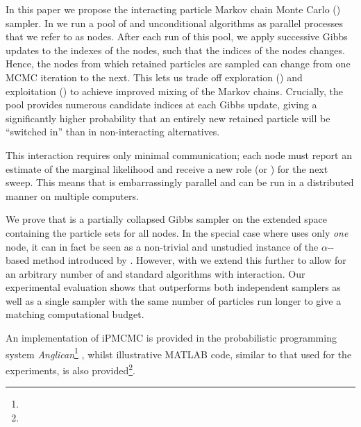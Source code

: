 In this paper we propose the interacting particle Markov chain Monte Carlo (\ipmcmc) sampler. In \ipmcmc we run a pool of \csmc and unconditional \smc algorithms as parallel processes that we refer to as nodes. After each run of this pool, we apply successive Gibbs updates to the indexes of the \csmc nodes, such that the indices of the \csmc nodes changes. Hence, the nodes from which retained particles are sampled can change from one MCMC iteration to the next. This lets us trade off exploration (\smc) and exploitation (\csmc) to achieve improved mixing of the Markov chains. Crucially, the pool provides numerous candidate indices at each Gibbs update, giving a significantly higher probability that an entirely new retained particle will be ``switched in'' than in non-interacting alternatives.

This interaction requires only minimal communication; each node must report an estimate of the marginal likelihood and receive a new role (\smc or \csmc) for the next sweep. This means that \ipmcmc is embarrassingly parallel and can be run in a distributed manner on multiple computers.


We prove that \ipmcmc is a partially collapsed Gibbs sampler on the extended space containing the particle sets for all nodes. In the special case where \ipmcmc uses only \emph{one} \csmc node, it can in fact be seen as a non-trivial and unstudied instance of the $\alpha$-\smc-based \citep{whiteley2016} \pmcmc method introduced by \citet{huggins2015}. However, with \ipmcmc we extend this further to allow for an arbitrary number of \csmc and standard \smc algorithms with interaction. Our experimental evaluation shows that \ipmcmc outperforms both independent \pg samplers as well as a single \pg sampler with the same number of particles run longer to give a matching computational budget.

An implementation of iPMCMC is provided in the probabilistic programming system \emph{Anglican}\footnote{\angurl} \citep{wood2014new}, whilst illustrative MATLAB code, similar to that used for the experiments, is also provided\footnote{\myurl}.


